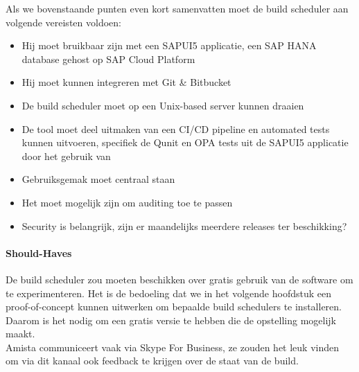             Als we bovenstaande punten even kort samenvatten moet de build scheduler aan volgende vereisten voldoen:
            \begin{itemize}
                \item Hij moet bruikbaar zijn met een SAPUI5 applicatie, een SAP HANA database gehost op SAP Cloud Platform
                \item Hij moet kunnen integreren met Git \& Bitbucket
                \item De build scheduler moet op een Unix-based server kunnen draaien
                \item De tool moet deel uitmaken van een CI/CD pipeline en automated tests kunnen uitvoeren, specifiek de Qunit en OPA tests uit de SAPUI5 applicatie door het gebruik van %
                \item Gebruiksgemak moet centraal staan
                \item Het moet mogelijk zijn om auditing toe te passen
                \item Security is belangrijk, zijn er maandelijks meerdere releases ter beschikking?
            \end{itemize}
            
            
            \paragraph{Should-Haves}
            De build scheduler zou moeten beschikken over gratis gebruik van de software om te experimenteren. Het is de bedoeling dat we in het volgende hoofdstuk een proof-of-concept kunnen uitwerken om bepaalde build schedulers te installeren. Daarom is het nodig om een gratis versie te hebben die de opstelling mogelijk maakt.\\
            Amista communiceert vaak via Skype For Business, ze zouden het leuk vinden om via dit kanaal ook feedback te krijgen over de staat van de build.
            
            
